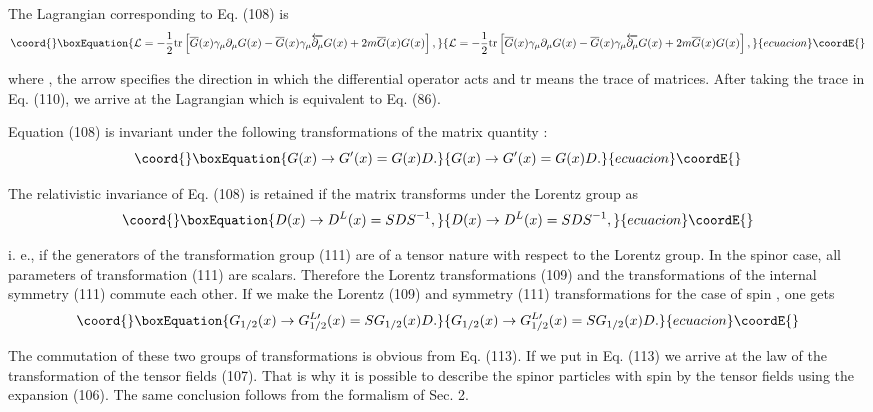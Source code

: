 \documentclass[a4paper,12pt]{article}
\begin{document}
The Lagrangian corresponding to Eq. (108) is
\begin{equation}\coord{}\boxEquation{
\mathcal{L}=-\frac 12\mbox{tr}\left[ \overline{G}(x)\gamma _\mu
\partial _\mu G(x)-\overline{G}(x)\gamma _\mu
\overleftarrow{\partial _\mu }G(x)+2m \overline{G}(x)G(x)\right] ,
\label{110}
}{
\mathcal{L}=-\frac 12\mbox{tr}\left[ \overline{G}(x)\gamma _\mu
\partial _\mu G(x)-\overline{G}(x)\gamma _\mu
\overleftarrow{\partial _\mu }G(x)+2m \overline{G}(x)G(x)\right] ,
}{ecuacion}\coordE{}\end{equation}

where \coordHE{}, the arrow specifies the
direction in which the differential operator acts and tr means the trace of
matrices. After taking the trace in Eq. (110), we arrive at the Lagrangian
which is equivalent to Eq. (86).

Equation (108) is invariant under the following transformations of
the matrix quantity \coordHE{}:
\begin{equation}\coord{}\boxEquation{
G(x)\rightarrow G^{\prime }(x)=G(x)D . \label{111}
}{
G(x)\rightarrow G^{\prime }(x)=G(x)D . }{ecuacion}\coordE{}\end{equation}

The relativistic invariance of Eq. (108) is retained if the matrix
\coordHE{} transforms under the Lorentz group as
\begin{equation}\coord{}\boxEquation{
D(x)\rightarrow D^L(x)=SDS^{-1} , \label{112}
}{
D(x)\rightarrow D^L(x)=SDS^{-1} , }{ecuacion}\coordE{}\end{equation}

i. e., if the generators of the transformation group (111) are of
a tensor nature with respect to the Lorentz group. In the spinor
case, all parameters of transformation (111) are scalars.
Therefore the Lorentz transformations (109) and the
transformations of the internal symmetry (111) commute each other.
If we make the Lorentz (109) and symmetry (111) transformations
for the case of spin \coordHE{}, one gets
\begin{equation}\coord{}\boxEquation{
G_{1/2}(x)\rightarrow G_{1/2}^{L\prime }(x)=SG_{1/2}(x)D .
\label{113}
}{
G_{1/2}(x)\rightarrow G_{1/2}^{L\prime }(x)=SG_{1/2}(x)D .
}{ecuacion}\coordE{}\end{equation}

The commutation of these two groups of transformations is obvious
from Eq. (113). If we put \coordHE{} in Eq. (113) we arrive at the
law of the transformation of the tensor fields (107). That is why
it is possible to describe the spinor particles with spin \coordHE{} by
the tensor fields using the expansion (106). The same conclusion
follows from the formalism of Sec. 2.
\end{document}
